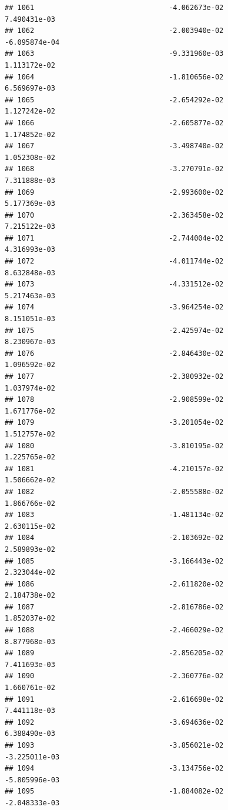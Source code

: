 \documentclass[
]{article}
\begin{document}
\begin{verbatim}
## 1061                                -4.062673e-02           7.490431e-03
## 1062                                -2.003940e-02          -6.095874e-04
## 1063                                -9.331960e-03           1.113172e-02
## 1064                                -1.810656e-02           6.569697e-03
## 1065                                -2.654292e-02           1.127242e-02
## 1066                                -2.605877e-02           1.174852e-02
## 1067                                -3.498740e-02           1.052308e-02
## 1068                                -3.270791e-02           7.311888e-03
## 1069                                -2.993600e-02           5.177369e-03
## 1070                                -2.363458e-02           7.215122e-03
## 1071                                -2.744004e-02           4.316993e-03
## 1072                                -4.011744e-02           8.632848e-03
## 1073                                -4.331512e-02           5.217463e-03
## 1074                                -3.964254e-02           8.151051e-03
## 1075                                -2.425974e-02           8.230967e-03
## 1076                                -2.846430e-02           1.096592e-02
## 1077                                -2.380932e-02           1.037974e-02
## 1078                                -2.908599e-02           1.671776e-02
## 1079                                -3.201054e-02           1.512757e-02
## 1080                                -3.810195e-02           1.225765e-02
## 1081                                -4.210157e-02           1.506662e-02
## 1082                                -2.055588e-02           1.866766e-02
## 1083                                -1.481134e-02           2.630115e-02
## 1084                                -2.103692e-02           2.589893e-02
## 1085                                -3.166443e-02           2.323044e-02
## 1086                                -2.611820e-02           2.184738e-02
## 1087                                -2.816786e-02           1.852037e-02
## 1088                                -2.466029e-02           8.877968e-03
## 1089                                -2.856205e-02           7.411693e-03
## 1090                                -2.360776e-02           1.660761e-02
## 1091                                -2.616698e-02           7.441118e-03
## 1092                                -3.694636e-02           6.388490e-03
## 1093                                -3.856021e-02          -3.225011e-03
## 1094                                -3.134756e-02          -5.805996e-03
## 1095                                -1.884082e-02          -2.048333e-03

\end{verbatim}
\end{document}
